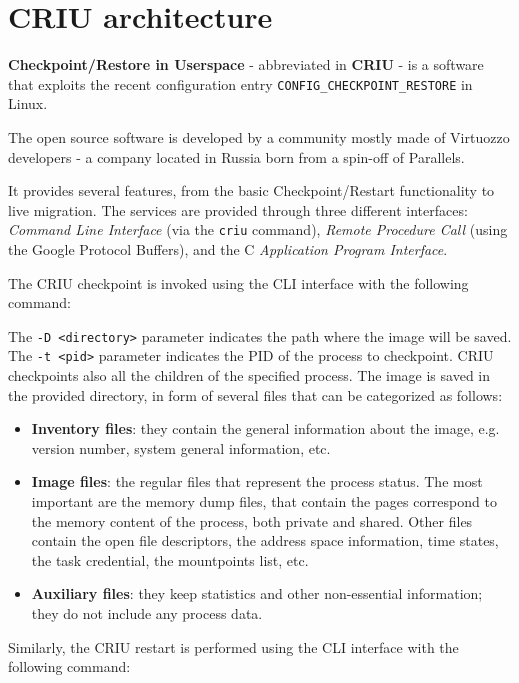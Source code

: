 \section{CRIU architecture}
\textbf{Checkpoint/Restore in Userspace} - abbreviated in \textbf{CRIU} -
\cite{CRIU} is a software that exploits the recent configuration entry
\texttt{CONFIG\_CHECKPOINT\_RESTORE} in Linux.

The open source software is developed by a community mostly made of Virtuozzo
developers - a company located in Russia born from a spin-off of Parallels.

It provides several features, from the basic Checkpoint/Restart functionality
to live
migration. The services are provided through three different interfaces:
\emph{Command Line Interface} (via the \texttt{criu} command),
\emph{Remote Procedure Call} (using the Google Protocol Buffers), and the
C \emph{Application Program Interface}.

The CRIU checkpoint is invoked using the CLI interface with the following
command:


The \texttt{-D <directory>} parameter indicates the path where the image
will be saved. The \texttt{-t <pid>} parameter indicates the PID of the
process to checkpoint. CRIU checkpoints also all the children of the specified
process. The image is saved in the provided directory, in form of several files
that can be categorized as follows:
\begin{itemize}
\item \textbf{Inventory files}: they contain the general information about the
      image, e.g. version number, system general information, etc.
\item \textbf{Image files}: the regular files that represent the process
      status. The most important are the memory dump files, that contain the 
      pages correspond to the memory content of
      the process, both private and shared. Other files contain the open file
      descriptors, the address
      space information, time states, the task credential, the mountpoints
      list, etc. 
\item \textbf{Auxiliary files}: they keep statistics and other non-essential
      information; they do not include any process data.
\end{itemize}

Similarly, the CRIU restart is performed using the CLI interface with the following command:

